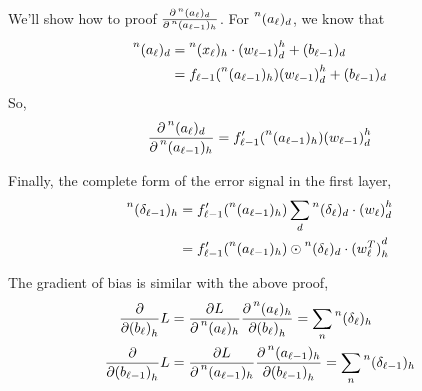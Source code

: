 \documentclass[12pt,a4paper]{article}%
\theoremstyle{definition}
\theoremstyle{plain}
\numberwithin{equation}{section}
\begin{document}
We'll show how to proof $\frac{\partial \prescript{n}{}{(a_{\ell})}_{d}}{\partial \prescript{n}{}{(a_{\ell-1})}_{h}}$. For $ \prescript{n}{}{(a_{\ell})}_{d}   $, we know that 
\begin{align*}
\prescript{n}{}{(a_{\ell})}_{d} &= \prescript{n}{}{(x_{\ell})}_{h} \cdot {(w_{\ell-1})}^{h}_{d}  + (b_{\ell-1})_{d} \\
													  &= f_{\ell-1}(\prescript{n}{}{(a_{\ell-1})}_{h}) {(w_{\ell-1})}^{h}_{d} + (b_{\ell-1})_{d}
\end{align*}
So,
\begin{equation}
\frac{\partial \prescript{n}{}{(a_{\ell})}_{d}}{\partial \prescript{n}{}{(a_{\ell-1})}_{h}} = f'_{\ell-1}(\prescript{n}{}{(a_{\ell-1})}_{h}) {(w_{\ell-1})}^{h}_{d} 
\end{equation}

Finally, the complete form of the error signal in the first layer,
\begin{align*}
\prescript{n}{}{(\delta_{\ell-1})}_{h} &= f'_{\ell-1}(\prescript{n}{}{(a_{\ell-1})}_{h}) \sum\limits_{d} 	\prescript{n}{}{(\delta_{\ell})}_{d} \cdot  {(w_{\ell})}^{h}_{d} \\
																  &= f'_{\ell-1}(\prescript{n}{}{(a_{\ell-1})}_{h}) \odot \prescript{n}{}{(\delta_{\ell})}_{d} \cdot {(w_{\ell}^{T})}^{d}_{h}
\end{align*}

The gradient of bias is similar with the above proof,
\begin{align*}
\frac{\partial}{\partial {(b_{\ell})}_{h}} L  &= \frac{\partial L}{\partial \prescript{n}{}{(a_{\ell})}_{h}} \frac{\partial \prescript{n}{}{(a_{\ell})}_{h}}{\partial {(b_{\ell})}_{h}} = \sum\limits_{n} \prescript{n}{}{(\delta_{\ell})}_{h} \\
\frac{\partial}{\partial {(b_{\ell-1})}_{h}} L  &= \frac{\partial L}{\partial \prescript{n}{}{(a_{\ell-1})}_{h}} \frac{\partial \prescript{n}{}{(a_{\ell-1})}_{h}}{\partial {(b_{\ell-1})}_{h}} = \sum\limits_{n} \prescript{n}{}{(\delta_{\ell-1})}_{h}
\end{align*}
\end{document}
